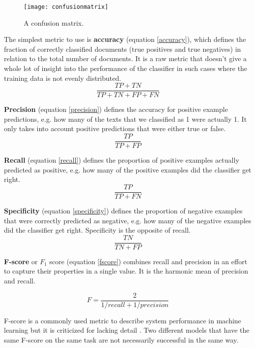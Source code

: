 \begin{figure}[t]
\texttt{[image: confusionmatrix]}
\centering
\caption{A confusion matrix.}
\label{fig:confusionmatrix}
\end{figure}

The simplest metric to use is \textbf{accuracy} (equation \ref{accuracy}), which defines the fraction of correctly classified documents (true positives and true negatives) in relation to the total number of documents.
It is a raw metric that doesn't give a whole lot of insight into the performance of the classifier in such cases where the training data is not evenly distributed.
\begin{equation}\label{accuracy}
  \dfrac{TP + TN}{TP+TN+FP+FN}
\end{equation}

\textbf{Precision} (equation \ref{precision}) defines the accuracy for positive example predictions, e.g. how many of the texts that we classified as 1 were actually 1.
It only takes into account positive predictions that were either true or false.
\begin{equation}\label{precision}
  \dfrac{TP}{TP+FP}
\end{equation}

\textbf{Recall} (equation \ref{recall}) defines the proportion of positive examples actually predicted as positive, e.g. how many of the positive examples did the classifier get right.
\begin{equation}\label{recall}
  \dfrac{TP}{TP+FN}
\end{equation}

\textbf{Specificity} (equation \ref{specificity}) defines the proportion of negative examples that were correctly predicted as negative, e.g. how many of the negative examples did the classifier get right.
Specificity is the opposite of recall.
\begin{equation}\label{specificity}
  \dfrac{TN}{TN+FP}
\end{equation}

\textbf{F-score} or $F_1$ score (equation \ref{fscore}) combines recall and precision in an effort to capture their properties in a single value.
It is the harmonic mean of precision and recall.

\begin{equation}\label{fscore}
  F=\dfrac{2}{1/recall + 1/precision}
\end{equation}

F-score is a commonly used metric to describe system performance in machine learning but it is criticized for lacking detail \cite{derczynski2016}.
Two different models that have the same F-score on the same task are not necessarily successful in the same way.

